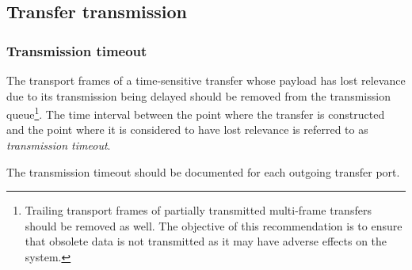 \subsection{Transfer transmission}

\subsubsection{Transmission timeout}

The transport frames of a time-sensitive transfer whose payload has lost relevance due to
its transmission being delayed should be removed from the transmission queue\footnote{%
    Trailing transport frames of partially transmitted multi-frame transfers should be removed as well.
    The objective of this recommendation is to ensure that obsolete data is not transmitted
    as it may have adverse effects on the system.
}.
The time interval between the point where the transfer is constructed and the point where it is considered
to have lost relevance is referred to as \emph{transmission timeout}.

The transmission timeout should be documented for each outgoing transfer port.

